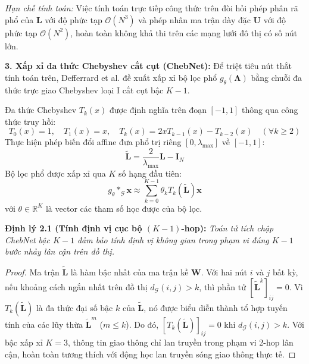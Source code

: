 \textit{Hạn chế tính toán:} Việc tính toán trực tiếp công thức trên đòi hỏi phép phân rã phổ của $\mathbf{L}$ với độ phức tạp $\mathcal{O}(N^3)$ và phép nhân ma trận dày đặc $\mathbf{U}$ với độ phức tạp $\mathcal{O}(N^2)$, hoàn toàn không khả thi trên các mạng lưới đô thị có số nút lớn.

\textbf{3. Xấp xỉ đa thức Chebyshev cắt cụt (ChebNet):}
Để triệt tiêu nút thắt tính toán trên, Defferrard et al. \cite{chebnet} đề xuất xấp xỉ bộ lọc phổ $g_\theta(\boldsymbol{\Lambda})$ bằng chuỗi đa thức trực giao Chebyshev loại I cắt cụt bậc $K-1$.

Đa thức Chebyshev $T_k(x)$ được định nghĩa trên đoạn $[-1, 1]$ thông qua công thức truy hồi:
\begin{equation}
    T_0(x) = 1, \quad T_1(x) = x, \quad T_k(x) = 2x T_{k-1}(x) - T_{k-2}(x) \quad (\forall k \ge 2)
\end{equation}
Thực hiện phép biến đổi affine đưa phổ trị riêng $[0, \lambda_{\max}]$ về $[-1, 1]$:
\begin{equation}
    \tilde{\mathbf{L}} = \frac{2}{\lambda_{\max}} \mathbf{L} - \mathbf{I}_N
\end{equation}
Bộ lọc phổ được xấp xỉ qua $K$ số hạng đầu tiên:
\begin{equation}
    g_\theta \ast_{\mathcal{G}} \mathbf{x} \approx \sum_{k=0}^{K-1} \theta_k T_k(\tilde{\mathbf{L}}) \mathbf{x}
\end{equation}
với $\theta \in \mathbb{R}^K$ là vector các tham số học được của bộ lọc.

\textbf{Định lý 2.1 (Tính định vị cục bộ $(K-1)$-hop):} \textit{Toán tử tích chập ChebNet bậc $K-1$ đảm bảo tính định vị không gian trong phạm vi đúng $K-1$ bước nhảy lân cận trên đồ thị.}
\begin{proof}
Ma trận $\tilde{\mathbf{L}}$ là hàm bậc nhất của ma trận kề $\mathbf{W}$. Với hai nút $i$ và $j$ bất kỳ, nếu khoảng cách ngắn nhất trên đồ thị $d_{\mathcal{G}}(i, j) > k$, thì phần tử $[\tilde{\mathbf{L}}^k]_{ij} = 0$. Vì $T_k(\tilde{\mathbf{L}})$ là đa thức đại số bậc $k$ của $\tilde{\mathbf{L}}$, nó được biểu diễn thành tổ hợp tuyến tính của các lũy thừa $\tilde{\mathbf{L}}^m$ ($m \le k$). Do đó, $[T_k(\tilde{\mathbf{L}})]_{ij} = 0$ khi $d_{\mathcal{G}}(i, j) > k$. Với bậc xấp xỉ $K=3$, thông tin giao thông chỉ lan truyền trong phạm vi 2-hop lân cận, hoàn toàn tương thích với động học lan truyền sóng giao thông thực tế.
\end{proof}

